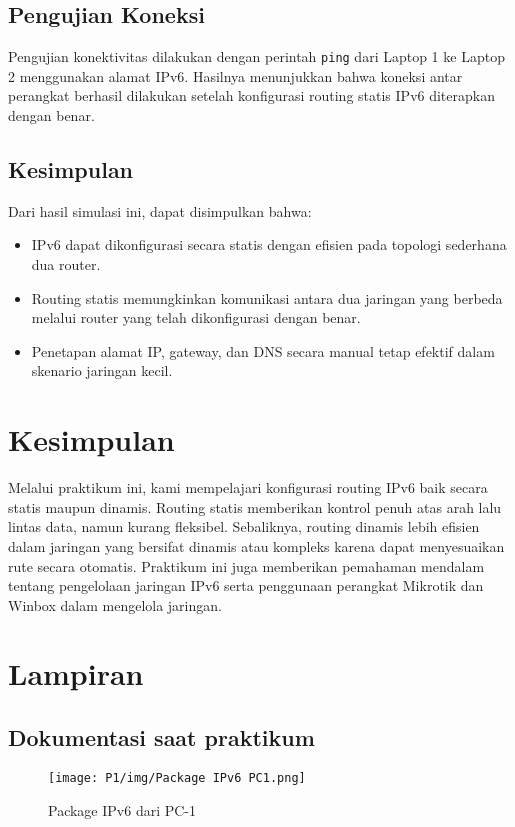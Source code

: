 \subsection*{Pengujian Koneksi}

Pengujian konektivitas dilakukan dengan perintah \texttt{ping} dari Laptop 1 ke Laptop 2 menggunakan alamat IPv6. Hasilnya menunjukkan bahwa koneksi antar perangkat berhasil dilakukan setelah konfigurasi routing statis IPv6 diterapkan dengan benar.

\subsection*{Kesimpulan}

Dari hasil simulasi ini, dapat disimpulkan bahwa:
\begin{itemize}
    \item IPv6 dapat dikonfigurasi secara statis dengan efisien pada topologi sederhana dua router.
    \item Routing statis memungkinkan komunikasi antara dua jaringan yang berbeda melalui router yang telah dikonfigurasi dengan benar.
    \item Penetapan alamat IP, gateway, dan DNS secara manual tetap efektif dalam skenario jaringan kecil.
\end{itemize}

\section{Kesimpulan}
Melalui praktikum ini, kami mempelajari konfigurasi routing IPv6 baik secara statis maupun dinamis. Routing statis memberikan kontrol penuh atas arah lalu lintas data, namun kurang fleksibel. Sebaliknya, routing dinamis lebih efisien dalam jaringan yang bersifat dinamis atau kompleks karena dapat menyesuaikan rute secara otomatis. Praktikum ini juga memberikan pemahaman mendalam tentang pengelolaan jaringan IPv6 serta penggunaan perangkat Mikrotik dan Winbox dalam mengelola jaringan.

\section{Lampiran}
\subsection{Dokumentasi saat praktikum}
\begin{figure}[H]
    \centering
    \texttt{[image: P1/img/Package IPv6 PC1.png]}
    \caption{Package IPv6 dari PC-1}
    \label{fig:crimping2_lampiran}
\end{figure}
\hfill

